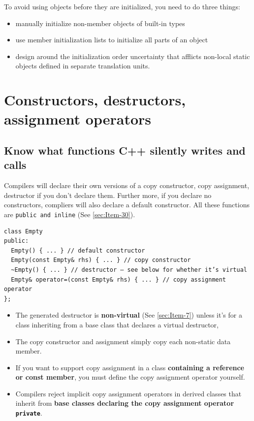 \documentclass[a4paper,twoside]{article}
\theoremstyle{definition}
\theoremstyle{remark}
\numberwithin{equation}{section}
\let\OldTexttt\texttt
\renewcommand{\texttt}[1]{{\color{blue} \OldTexttt{#1}}}
\begin{document}
To avoid using objects before they are initialized, you need to do
three things:
\begin{itemize}
\item manually initialize non-member objects of built-in types
\item use member initialization lists to initialize all parts of an
  object
\item design around the initialization order uncertainty that afflicts
  non-local static objects defined in separate translation units.
\end{itemize}

\newpage
\section{Constructors, destructors, assignment operators}

\subsection{Know what functions C++ silently writes and calls}
\label{sec:Item-5}

Compilers will declare their own versions of a copy constructor, copy
assignment, destructor if you don't declare them. Further more, if you
declare no constructors, compliers will also declare a default
constructor. All these functions are \texttt{public and inline} (See
\ref{sec:Item-30}).
\begin{verbatim}
class Empty
public:
  Empty() { ... } // default constructor
  Empty(const Empty& rhs) { ... } // copy constructor
  ~Empty() { ... } // destructor — see below for whether it’s virtual
  Empty& operator=(const Empty& rhs) { ... } // copy assignment operator
};
\end{verbatim}
\begin{itemize}
\item The generated destructor is \textbf{non-virtual} (See \ref{sec:Item-7})
  unless it's for a class inheriting from a base class that declares a
  virtual destructor,
\item The copy constructor and assignment simply copy each non-static
  data member.
\item If you want to support copy assignment in a class \textbf{containing a
  reference or const member}, you must define the copy assignment
  operator yourself.
\item Compilers reject implicit copy assignment operators in derived
  classes that inherit from \textbf{base classes declaring the copy assignment
  operator \texttt{private}}.
\end{itemize}
\end{document}
